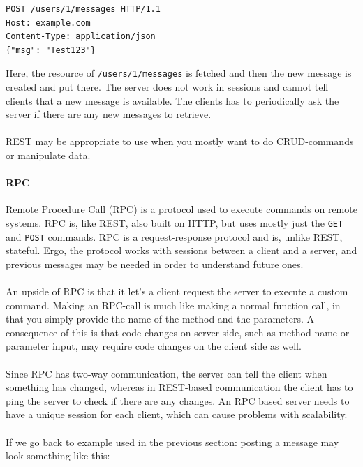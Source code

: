 \documentclass{article}
\begin{document}
\begin{lstlisting}
POST /users/1/messages HTTP/1.1
Host: example.com
Content-Type: application/json
{"msg": "Test123"}
\end{lstlisting}

Here, the resource of \texttt{/users/1/messages} is fetched and then the
new message is created and put there. The server does not work in
sessions and cannot tell clients that a new message is available. The
clients has to periodically ask the server if there are any new messages
to retrieve.
\\ \\
REST may be appropriate to use when you mostly want to do CRUD-commands
or manipulate data.

\paragraph{RPC}

Remote Procedure Call (RPC) is a protocol used to execute commands on remote systems. RPC is, like REST, also
built on HTTP, but uses mostly just the \texttt{GET} and \texttt{POST} commands. RPC is a request-response protocol and is, unlike
REST, stateful. Ergo, the protocol works with sessions between a client and a server, and previous messages may
be needed in order to understand future ones.
\\ \\
An upside of RPC is that it let's a client request the server to execute
a custom command. Making an RPC-call is much like making a normal
function call, in that you simply provide the name of the method and the
parameters. A consequence of this is that code changes on server-side,
such as method-name or parameter input, may require code changes on the
client side as well.
\\ \\
Since RPC has two-way communication, the server can tell the client when
something has changed, whereas in REST-based communication the client
has to ping the server to check if there are any changes. An RPC based
server needs to have a unique session for each client, which can cause
problems with scalability.
\\ \\
If we go back to example used in the previous section: posting a message
may look something like this:
\end{document}
